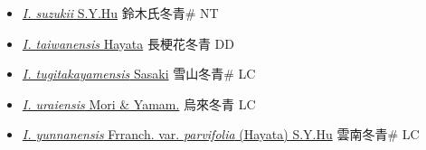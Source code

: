 \begin{itemize}
\begin{itemize}
        \item[] \href{http://www.theplantlist.org/tpl1.1/search?q=Ilex+suzukii}{\textit{I. suzukii} S.Y.Hu}   鈴木氏冬青\# NT
        \item[] \href{http://www.theplantlist.org/tpl1.1/search?q=Ilex+taiwanensis}{\textit{I. taiwanensis} Hayata}   長梗花冬青 DD
        \item[] \href{http://www.theplantlist.org/tpl1.1/search?q=Ilex+tugitakayamensis}{\textit{I. tugitakayamensis} Sasaki}   雪山冬青\# LC
        \item[] \href{http://www.theplantlist.org/tpl1.1/search?q=Ilex+uraiensis}{\textit{I. uraiensis} Mori \& Yamam.}   烏來冬青 LC
        \item[] \href{http://www.theplantlist.org/tpl1.1/search?q=Ilex+yunnanensis+var.+parvifolia}{\textit{I. yunnanensis} Frranch. var. \textit{parvifolia} (Hayata) S.Y.Hu}   雲南冬青\# LC
  \end{itemize}
  \end{itemize}
